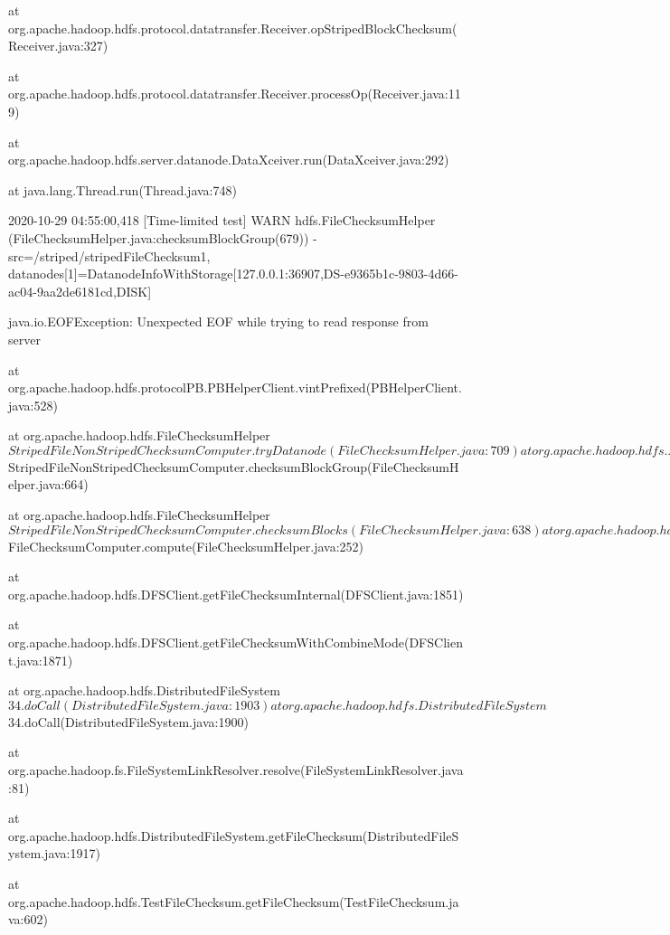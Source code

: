 \documentclass{report}%
\begin{document}
\begin{enumerate}
\begin{spverbatim}
    at org.apache.hadoop.hdfs.protocol.datatransfer.Receiver.opStripedBlockChecksum(Receiver.java:327)

    at org.apache.hadoop.hdfs.protocol.datatransfer.Receiver.processOp(Receiver.java:119)

    at org.apache.hadoop.hdfs.server.datanode.DataXceiver.run(DataXceiver.java:292)

    at java.lang.Thread.run(Thread.java:748)

2020-10-29 04:55:00,418 [Time-limited test] WARN hdfs.FileChecksumHelper (FileChecksumHelper.java:checksumBlockGroup(679)) - src=/striped/stripedFileChecksum1, datanodes[1]=DatanodeInfoWithStorage[127.0.0.1:36907,DS-e9365b1c-9803-4d66-ac04-9aa2de6181cd,DISK]

java.io.EOFException: Unexpected EOF while trying to read response from server

    at org.apache.hadoop.hdfs.protocolPB.PBHelperClient.vintPrefixed(PBHelperClient.java:528)

    at org.apache.hadoop.hdfs.FileChecksumHelper$StripedFileNonStripedChecksumComputer.tryDatanode(FileChecksumHelper.java:709)

    at org.apache.hadoop.hdfs.FileChecksumHelper$StripedFileNonStripedChecksumComputer.checksumBlockGroup(FileChecksumHelper.java:664)

    at org.apache.hadoop.hdfs.FileChecksumHelper$StripedFileNonStripedChecksumComputer.checksumBlocks(FileChecksumHelper.java:638)

    at org.apache.hadoop.hdfs.FileChecksumHelper$FileChecksumComputer.compute(FileChecksumHelper.java:252)

    at org.apache.hadoop.hdfs.DFSClient.getFileChecksumInternal(DFSClient.java:1851)

    at org.apache.hadoop.hdfs.DFSClient.getFileChecksumWithCombineMode(DFSClient.java:1871)

    at org.apache.hadoop.hdfs.DistributedFileSystem$34.doCall(DistributedFileSystem.java:1903)

    at org.apache.hadoop.hdfs.DistributedFileSystem$34.doCall(DistributedFileSystem.java:1900)

    at org.apache.hadoop.fs.FileSystemLinkResolver.resolve(FileSystemLinkResolver.java:81)

    at org.apache.hadoop.hdfs.DistributedFileSystem.getFileChecksum(DistributedFileSystem.java:1917)

    at org.apache.hadoop.hdfs.TestFileChecksum.getFileChecksum(TestFileChecksum.java:602)


\end{spverbatim}
\end{enumerate}
\end{document}
